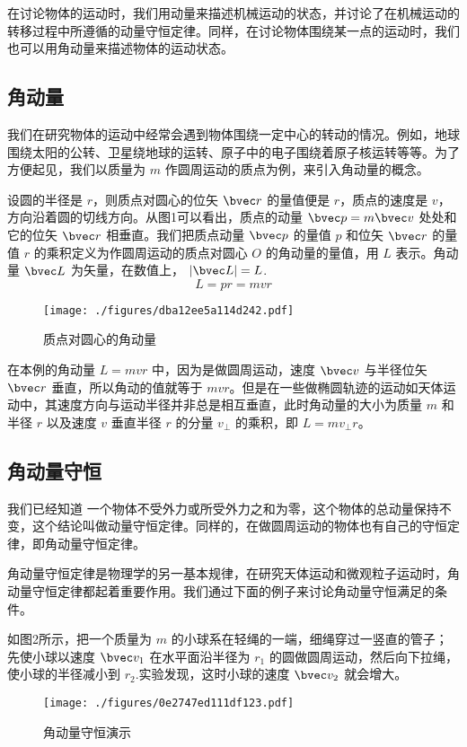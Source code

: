 
\begin{issues}
\issueTODO
\end{issues}

在讨论物体的运动时，我们用动量来描述机械运动的状态，并讨论了在机械运动的转移过程中所遵循的动量守恒定律。同样，在讨论物体围绕某一点的运动时，我们也可以用角动量来描述物体的运动状态。
\subsection{角动量}
我们在研究物体的运动中经常会遇到物体围绕一定中心的转动的情况。例如，地球围绕太阳的公转、卫星绕地球的运转、原子中的电子围绕着原子核运转等等。为了方便起见，我们以质量为 $m$ 作圆周运动的质点为例，来引入角动量的概念。

设圆的半径是 $r$，则质点对圆心的位矢 $\bvec r$ 的量值便是 $r$，质点的速度是 $v$，方向沿着圆的切线方向。从图1可以看出，质点的动量 $\bvec p = m\bvec v$ 处处和它的位矢 $\bvec r$ 相垂直。我们把质点动量 $\bvec p$ 的量值 $p$ 和位矢 $\bvec r$ 的量值 $r$ 的乘积定义为作圆周运动的质点对圆心 $O$ 的角动量的量值，用 $L$ 表示。角动量 $\bvec L$ 为矢量，在数值上， $|\bvec L| = L$.
\begin{equation}
L = pr = mvr
\end{equation}
\begin{figure}[ht]
\centering
\texttt{[image: ./figures/dba12ee5a114d242.pdf]}
\caption{质点对圆心的角动量} \label{fig_AngMo_1}
\end{figure}

在本例的角动量 $L=mvr$ 中，因为是做圆周运动，速度 $\bvec v$ 与半径位矢 $\bvec r$ 垂直，所以角动的值就等于 $mvr$。但是在一些做椭圆轨迹的运动如天体运动中，其速度方向与运动半径并非总是相互垂直，此时角动量的大小为质量 $m$ 和半径 $r$ 以及速度 $v$ 垂直半径 $r$ 的分量 $v_{\perp}$ 的乘积，即 $L=m v_{\perp}r$。
\subsection{角动量守恒}
我们已经知道 一个物体不受外力或所受外力之和为零，这个物体的总动量保持不变，这个结论叫做动量守恒定律。同样的，在做圆周运动的物体也有自己的守恒定律，即角动量守恒定律。

角动量守恒定律是物理学的另一基本规律，在研究天体运动和微观粒子运动时，角动量守恒定律都起着重要作用。我们通过下面的例子来讨论角动量守恒满足的条件。

如图2所示，把一个质量为 $m$ 的小球系在轻绳的一端，细绳穿过一竖直的管子；先使小球以速度 $\bvec v_1$ 在水平面沿半径为 $r_1$ 的圆做圆周运动，然后向下拉绳，使小球的半径减小到 $r_2$.实验发现，这时小球的速度 $\bvec v_2$ 就会增大。
\begin{figure}[ht]
\centering
\texttt{[image: ./figures/0e2747ed111df123.pdf]}
\caption{角动量守恒演示} \label{fig_AngMo_2}
\end{figure}

